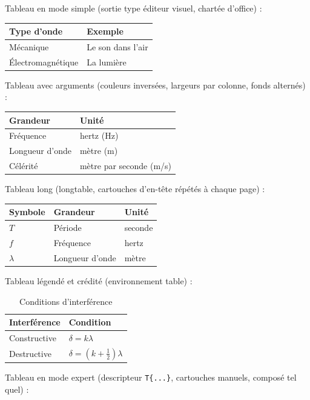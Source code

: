 Tableau en mode simple (sortie type éditeur visuel, chartée d'office) :

\begin{tabular}{|l|l|}
\hline
Type d'onde & Exemple \\
\hline
Mécanique & Le son dans l'air \\
\hline
Électromagnétique & La lumière \\
\hline
\end{tabular}

Tableau avec arguments (couleurs inversées, largeurs par colonne, fonds alternés) :

\begin{tabular}[secondary][primary][0.3,0.5][left][normal][normal][alternate]{|l|l|}
\hline
Grandeur & Unité \\
\hline
Fréquence & hertz (Hz) \\
\hline
Longueur d'onde & mètre (m) \\
\hline
Célérité & mètre par seconde (m/s) \\
\hline
\end{tabular}

Tableau long (longtable, cartouches d'en-tête répétés à chaque page) :

\begin{longtable}{|l|l|l|}
\hline
Symbole & Grandeur & Unité \\
\hline
\( T \) & Période & seconde \\
\hline
\( f \) & Fréquence & hertz \\
\hline
\( \lambda \) & Longueur d'onde & mètre \\
\hline
\end{longtable}

Tableau légendé et crédité (environnement table) :

\begin{table}
\centering
\begin{tabular}{|l|l|}
\hline
Interférence & Condition \\
\hline
Constructive & \( \delta = k \lambda \) \\
\hline
Destructive & \( \delta = ( k + \tfrac{1}{2} ) \lambda \) \\
\hline
\end{tabular}
\caption{Conditions d'interférence}
\end{table}

Tableau en mode expert (descripteur \verb|T{...}|, cartouches manuels, composé tel quel) :

